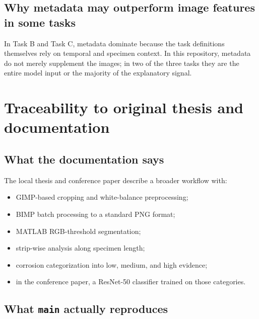 \documentclass[11pt]{article}
\begin{document}
\subsection{Why metadata may outperform image features in some tasks}
In Task B and Task C, metadata dominate because the task definitions themselves rely on temporal and specimen context. In this repository, metadata do not merely supplement the images; in two of the three tasks they are the entire model input or the majority of the explanatory signal.

\section{Traceability to original thesis and documentation}

\subsection{What the documentation says}
The local thesis and conference paper describe a broader workflow with:
\begin{itemize}
  \item GIMP-based cropping and white-balance preprocessing;
  \item BIMP batch processing to a standard PNG format;
  \item MATLAB RGB-threshold segmentation;
  \item strip-wise analysis along specimen length;
  \item corrosion categorization into low, medium, and high evidence;
  \item in the conference paper, a ResNet-50 classifier trained on those categories.
\end{itemize}

\subsection{What \texttt{main} actually reproduces}
\end{document}
